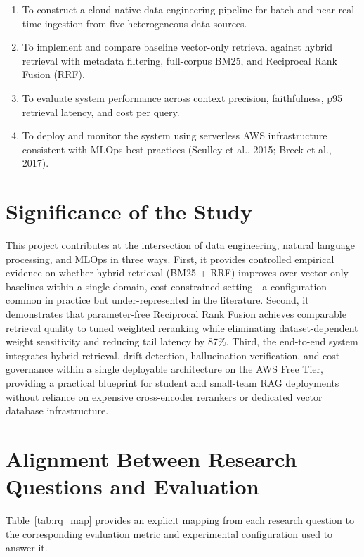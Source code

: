 \begin{enumerate}[leftmargin=0.5in]
  \item To construct a cloud-native data engineering pipeline for batch and near-real-time ingestion from five heterogeneous data sources.
  \item To implement and compare baseline vector-only retrieval against hybrid retrieval with metadata filtering, full-corpus BM25, and Reciprocal Rank Fusion (RRF).
  \item To evaluate system performance across context precision, faithfulness, p95 retrieval latency, and cost per query.
  \item To deploy and monitor the system using serverless AWS infrastructure consistent with MLOps best practices (Sculley et al., 2015; Breck et al., 2017).
\end{enumerate}

\section{Significance of the Study}
\label{sec:significance}

This project contributes at the intersection of data engineering, natural language processing, and MLOps in three ways. First, it provides controlled empirical evidence on whether hybrid retrieval (BM25 + RRF) improves over vector-only baselines within a single-domain, cost-constrained setting---a configuration common in practice but under-represented in the literature. Second, it demonstrates that parameter-free Reciprocal Rank Fusion achieves comparable retrieval quality to tuned weighted reranking while eliminating dataset-dependent weight sensitivity and reducing tail latency by 87\%. Third, the end-to-end system integrates hybrid retrieval, drift detection, hallucination verification, and cost governance within a single deployable architecture on the AWS Free Tier, providing a practical blueprint for student and small-team RAG deployments without reliance on expensive cross-encoder rerankers or dedicated vector database infrastructure.

\section{Alignment Between Research Questions and Evaluation}
\label{sec:rq_eval_map}

Table~\ref{tab:rq_map} provides an explicit mapping from each research question to the corresponding evaluation metric and experimental configuration used to answer it.

